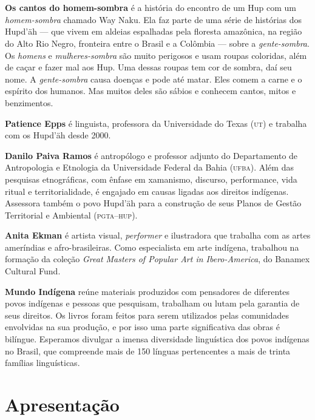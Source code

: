 \chapter{}

\textbf{Os cantos do homem-sombra} é a história do encontro de um Hup com um \textit{homem-sombra} chamado Way Naku. Ela faz parte de uma série de histórias dos Hupd'äh --- que vivem em aldeias espalhadas pela floresta amazônica, na região do Alto Rio Negro, fronteira entre o Brasil e a Colômbia --- sobre a \textit{gente-sombra}. Os \textit{homens} e \textit{mulheres-sombra} são muito perigosos e usam roupas coloridas, além de caçar e fazer mal aos Hup. Uma dessas roupas tem cor de sombra, daí seu nome. A \textit{gente-sombra} causa doenças e pode até matar. Eles comem a carne e o espírito dos humanos. Mas muitos deles são sábios e conhecem cantos, mitos e benzimentos. 

\textbf{Patience Epps} ​é linguista, professora da Universidade do Texas \textsc{(ut)} e trabalha com os Hupd'äh desde 2000.

\textbf{Danilo Paiva Ramos} é antropólogo e professor adjunto do Departamento de Antropologia e Etnologia da Universidade Federal da Bahia \textsc{(ufba)}. Além das pesquisas etnográficas, com ênfase em xamanismo, discurso, performance, vida ritual e territorialidade, é engajado em causas ligadas aos direitos indígenas. Assessora também o povo Hupd'äh para a construção de seus Planos de Gestão Territorial e Ambiental (\textsc{pgta--hup}).

\textbf{Anita Ekman} é artista visual, \textit{performer} e ilustradora que trabalha com as artes ameríndias e afro-brasileiras. Como especialista em arte indígena, trabalhou na formação da coleção \textit{Great Masters of Popular Art in Ibero-America}, do Banamex Cultural Fund.

\textbf{Mundo Indígena} reúne materiais produzidos com pensadores de diferentes povos indígenas e pessoas que pesquisam, trabalham ou lutam pela garantia de seus direitos. Os livros foram feitos para serem utilizados pelas comunidades envolvidas na sua produção, e por isso uma parte significativa das obras é bilíngue. Esperamos divulgar a imensa diversidade linguística dos povos indígenas no Brasil, que compreende mais de 150 línguas pertencentes a mais de trinta famílias linguísticas.


\chapter{Apresentação}


